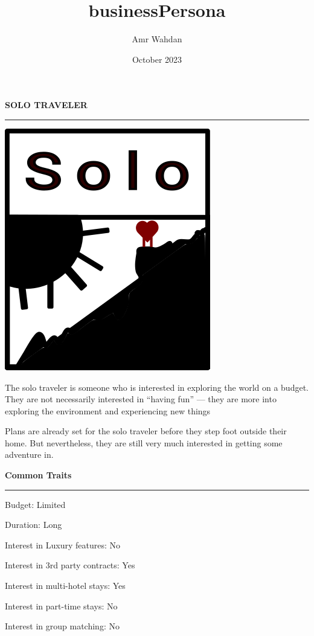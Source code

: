 \documentclass[12pt]{article}
\title{businessPersona}
\author{Amr Wahdan}
\date{October 2023}
\begin{document}
{\Huge\bfseries SOLO TRAVELER} \\
\hrule
\vspace{3em}
\begin{minipage}{0.45\textwidth}
    \includegraphics[scale=0.7]{rect14.png}
\end{minipage}
\begin{minipage}{0.5\textwidth}
    \begin{flushleft}
    \large
    The solo traveler is someone who is interested in exploring the world on a budget. They are not necessarily interested in ``having fun'' --- they are more into exploring the environment and experiencing new things \par 
    \vspace{1em}
    Plans are already set for the solo traveler before they step foot outside their home. But nevertheless, they are still very much interested in getting some adventure in.
    \end{flushleft}
\end{minipage}

\vspace{6em}

{\Huge\bfseries Common Traits} \\
\hrule
\Large
\begin{tcolorbox}[colback=red!10!white]
    Budget: Limited
\end{tcolorbox}
\begin{tcolorbox}
    Duration: Long
\end{tcolorbox}
\begin{tcolorbox}[colback=red!10!white]
    Interest in Luxury features: No
\end{tcolorbox}
\begin{tcolorbox}
    Interest in 3rd party contracts: Yes
\end{tcolorbox}
\begin{tcolorbox}
    Interest in multi-hotel stays: Yes
\end{tcolorbox}
\begin{tcolorbox}[colback=red!10!white]
    Interest in part-time stays: No
\end{tcolorbox}
\begin{tcolorbox}[colback=red!10!white]
    Interest in group matching: No
\end{tcolorbox}
\end{document}
